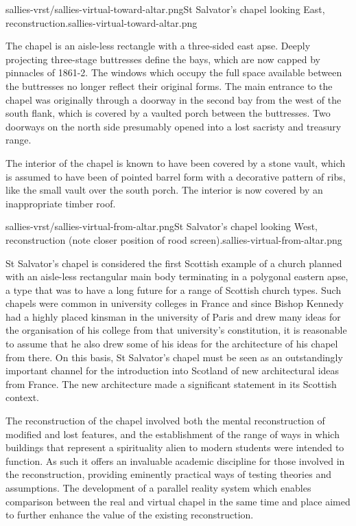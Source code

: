        {sallies-vrst/sallies-virtual-toward-altar.png}{St Salvator's chapel looking East, reconstruction.}{sallies-virtual-toward-altar.png}

The chapel is an aisle-less rectangle with a three-sided east apse. Deeply projecting three-stage buttresses define the bays, which are now capped by pinnacles of 1861-2. The windows which occupy the full space available between the buttresses no longer reflect their original forms. The main entrance to the chapel was originally through a doorway in the second bay from the west of the south flank, which is covered by a vaulted porch between the buttresses. Two doorways on the north side presumably opened into a lost sacristy and treasury range.

The interior of the chapel is known to have been covered by a stone vault, which is assumed to have been of pointed barrel form with a decorative pattern of ribs, like the small vault over the south porch. The interior is now covered by an inappropriate timber roof.

       {sallies-vrst/sallies-virtual-from-altar.png}{St Salvator's chapel looking West, reconstruction (note closer position of rood screen).}{sallies-virtual-from-altar.png}

St Salvator's chapel is considered the first Scottish example of a church planned with an aisle-less rectangular main body terminating in a polygonal eastern apse, a type that was to have a long future for a range of Scottish church types. Such chapels were common in university colleges in France and since Bishop Kennedy had a highly placed kinsman in the university of Paris and drew many ideas for the organisation of his college from that university's constitution, it is reasonable to assume that he also drew some of his ideas for the architecture of his chapel from there. On this basis, St Salvator's chapel must be seen as an outstandingly important channel for the introduction into Scotland of new architectural ideas from France. The new architecture made a significant statement in its Scottish context. 

The reconstruction of the chapel involved both the mental reconstruction of modified and lost features, and the establishment of the range of ways in which buildings that represent a spirituality alien to modern students were intended to function. As such it offers an invaluable academic discipline for those involved in the reconstruction, providing eminently practical ways of testing theories and assumptions. The development of a parallel reality system which enables comparison between the real and virtual chapel in the same time and place aimed to further enhance the value of the existing reconstruction.

